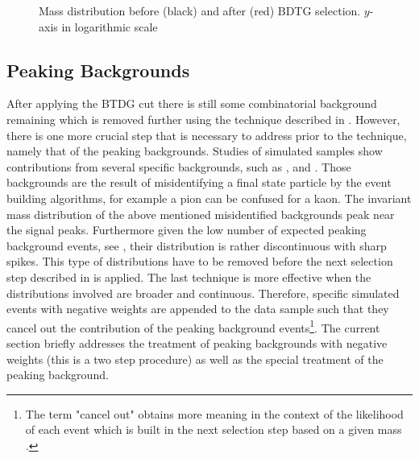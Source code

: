 \begin{figure}[h]
\begin{center}
  \scalebox{1}{}
  \caption{Mass distribution before (black) and after (red) BDTG selection. $y$-axis in logarithmic scale}
  \label{mass_BDTG_selection}
\end{center}
\end{figure}

\subsection{Peaking Backgrounds}
\label{peaking_backgrounds}

After applying the BTDG cut there is still some combinatorial background remaining which is removed
further using the \sPlot technique described in . However, there is
one more crucial step that is necessary to address prior to the \sPlot technique, namely that of the peaking backgrounds.
Studies of simulated samples show contributions from several specific backgrounds, such as \BsJpsiKK, \BsJpsipipi and \BdJpsipipi.
Those backgrounds are the result of misidentifying a final state particle by the event building algorithms, for example a pion can
be confused for a kaon. The invariant mass distribution of the above mentioned misidentified backgrounds peak
near the \BJpsiKpi signal peaks. Furthermore given the low number of expected peaking background events, see ,
their distribution is rather discontinuous with sharp spikes. This type of distributions have to be removed
before the next selection step described in  is applied. The last technique is more effective
when the distributions involved are broader and continuous. Therefore, specific simulated events with negative weights
are appended to the data sample such that they cancel out the contribution of the peaking background
events\footnote{The term "cancel out" obtains more meaning in the context of the likelihood of each event which is built in
the next selection step  based on a given mass \pdf. }.
The current section briefly addresses the treatment of peaking backgrounds with negative weights (this is a two step procedure)
as well as the special treatment of the \LbJpsippi peaking background.

